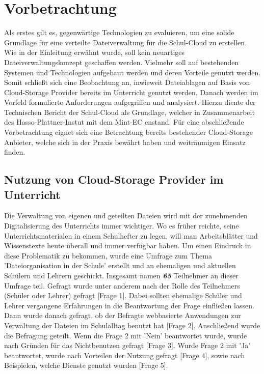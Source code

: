 \section{Vorbetrachtung}
\label{sec:relatedwork}

Als erstes gilt es, gegenwärtige Technologien zu evaluieren, um eine solide Grundlage für eine verteilte Dateiverwaltung für die Schul-Cloud zu erstellen. Wie in der Einleitung erwähnt wurde, soll kein neuartiges Dateiverwaltungskonzept geschaffen werden. Vielmehr soll auf bestehenden Systemen und Technologien aufgebaut werden und deren Vorteile genutzt werden. Somit schließt sich eine Beobachtung an, inwieweit Dateiablagen auf Basis von Cloud-Storage Provider bereits im Unterricht genutzt werden. Danach werden im Vorfeld formulierte Anforderungen aufgegriffen und analysiert. Hierzu diente der Technischen Bericht der Schul-Cloud \cite{paper:technischerbericht} als Grundlage, welcher in Zusammenarbeit des Hasso-Plattner-Instut mit dem Mint-EC enstand. Für eine abschließende Vorbetrachtung eignet sich eine Betrachtung bereits bestehender Cloud-Storage Anbieter, welche sich in der Praxis bewährt haben und weiträumigen Einsatz finden.

\subsection{Nutzung von Cloud-Storage Provider im Unterricht}

Die Verwaltung von eigenen und geteilten Dateien wird mit der zunehmenden Digitalisierung des Unterrichts immer wichtiger. Wo es früher reichte, seine Unterrichtsmaterialen in einem Schulhefter zu legen, will man Arbeitsblätter und Wissenstexte heute überall und immer verfügbar haben. Um einen Eindruck in diese Problematik zu bekommen, wurde eine Umfrage zum Thema 'Dateiorganisation in der Schule' \cite{survey:umfragedateiorganisation} erstellt und an ehemaligen und aktuellen Schülern und Lehrern geschickt. Insgesamt namen \textbf{\textit{65}}  Teilnehmer  an dieser Umfrage teil. Gefragt wurde unter anderem nach der Rolle des Teilnehmers (Schüler oder Lehrer) gefragt [Frage 1]. Dabei sollten ehemalige Schüler und Lehrer vergangene Erfahrungen in die Beantwortung der Frage einfließen lassen. Dann wurde danach gefragt, ob der Befragte webbasierte Anwendungen zur Verwaltung der Dateien im Schulalltag benutzt hat [Frage 2]. Anschließend wurde die Befragung geteilt. Wenn die Frage 2 mit 'Nein' beantwortet wurde, wurde nach Gründen für das Nichtbenutzen gefragt [Frage 3]. Wurde Frage 2 mit 'Ja' beantwortet, wurde nach Vorteilen der Nutzung gefragt [Frage 4], sowie nach Beispielen, welche Dienste genutzt wurden [Frage 5]. 

